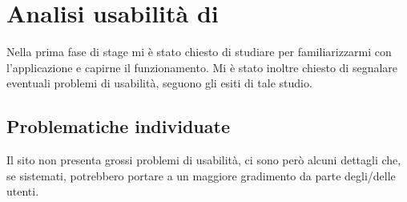 \section{Analisi usabilità di \fiscoloWeb}\label{usabilita-fiscolo}

Nella prima fase di stage mi è stato chiesto di studiare \fiscoloWeb{} per
familiarizzarmi con l'applicazione e capirne il funzionamento. Mi è stato
inoltre chiesto di segnalare eventuali problemi di usabilità, seguono gli esiti
di tale studio.

\subsection{Problematiche individuate}
Il sito non presenta grossi problemi di usabilità, ci sono però alcuni dettagli che,
se sistemati, potrebbero portare a un maggiore gradimento da parte degli/delle utenti.

